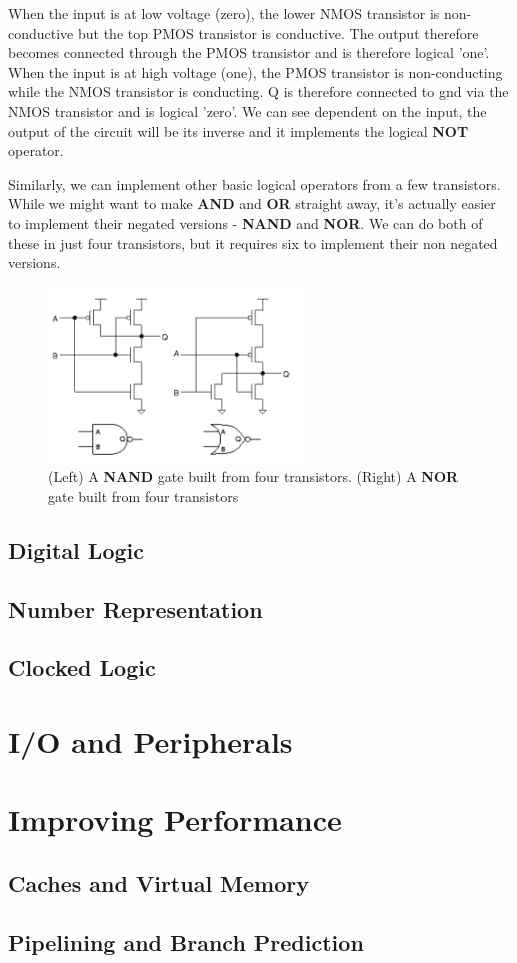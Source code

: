 \documentclass{article}
\begin{document}
	When the input is at low voltage (zero), the lower NMOS transistor is non-conductive but the top PMOS transistor is conductive. The output therefore becomes connected through the PMOS transistor and is therefore logical 'one'. When the input is at high voltage (one), the PMOS transistor is non-conducting while the NMOS transistor is conducting. Q is therefore connected to gnd via the NMOS transistor and is logical 'zero'. We can see dependent on the input, the output of the circuit will be its inverse and it implements the logical \textbf{NOT} operator.
	
	Similarly, we can implement other basic logical operators from a few transistors. While we might want to make \textbf{AND} and \textbf{OR} straight away, it's actually easier to implement their negated versions - \textbf{NAND} and \textbf{NOR}. We can do both of these in just four transistors, but it requires six to implement their non negated versions.
	
	\begin{figure}[ht]
		\centering
		\includegraphics[width=0.6\textwidth]{nand_nor_transistors}
		\caption{(Left) A \textbf{NAND} gate built from four transistors.  (Right) A \textbf{NOR} gate built from four transistors}
		\label{fig:nand_nor_transistors}
	\end{figure}
	
	\subsection{Digital Logic}
	\subsection{Number Representation}
	\subsection{Clocked Logic}
	
	\section{I/O and Peripherals}
	
	\section{Improving Performance}
	\subsection{Caches and Virtual Memory}
	\subsection{Pipelining and Branch Prediction}
	
	\newpage
	\listoffigures
	\printindex	
\end{document}
